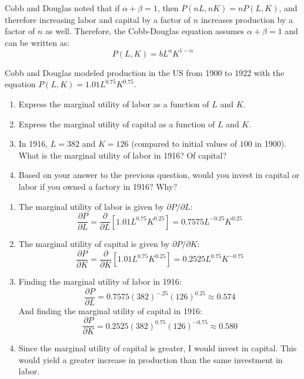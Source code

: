 Cobb and Douglas noted that if $\alpha + \beta = 1$, then $P(nL, nK) = nP(L, 
K)$, and therefore increasing labor and capital by a factor of $n$ increases 
production by a factor of $n$ as well. Therefore, the Cobb-Douglas equation 
assumes $\alpha + \beta = 1$ and can be written as:
$$P(L, K) = bL^{\alpha}K^{1 - \alpha}$$

\begin{Exercise}[title = {Cobb-Douglas Production Model}, label = cobb]
Cobb and Douglas modeled production in the US from 1900 to 1922 with the 
equation $P(L, K) = 1.01L^{0.75} K^{0.75}$. 
\begin{enumerate}
\item Express the marginal utility of labor as a function of $L$ and $K$.
\item Express the marginal utility of capital as a function of $L$ and $K$.
\item In 1916, $L = 382$ and $K = 126$ (compared to initial values of $100$ in 
1900). What is the marginal utility of labor in 1916? Of capital?
\item Based on your answer to the previous question, would you invest in 
capital or labor if you owned a factory in 1916? Why?
\end{enumerate}
\vspace{50mm}
\end{Exercise}

\begin{Answer}[ref = cobb]
\begin{enumerate}
    \item The marginal utility of labor is given by $\partial P / \partial L$:
    $$\frac{\partial P}{\partial L} = \frac{\partial}{\partial L} \left[ 1.01 
    L^{0.75} K^{0.25} \right] = 0.7575 L^{-0.25} K^{0.25}$$
    \item The marginal utility of capital is given by $\partial P / \partial 
    K$:
    $$\frac{\partial P}{\partial K} = \frac{\partial}{\partial K} \left[ 1.01 
    L^{0.75} K^{0.25} \right] = 0.2525 L^{0.75} K^{-0.75}$$
    \item Finding the marginal utility of labor in 1916:
    $$\frac{\partial P}{\partial L} = 0.7575 \left( 382 \right)^{-.25} \left( 
    126 \right)^{0.25} \approx 0.574$$
    And finding the marginal utility of capital in 1916:
    $$\frac{\partial P}{\partial K} = 0.2525 \left( 382 \right)^{0.75} \left( 
    126 \right)^{-0.75} \approx 0.580$$
    \item Since the marginal utility of capital is greater, I would invest in 
    capital. This would yield a greater increase in production than the same 
    investment in labor. 
\end{enumerate}
\end{Answer}